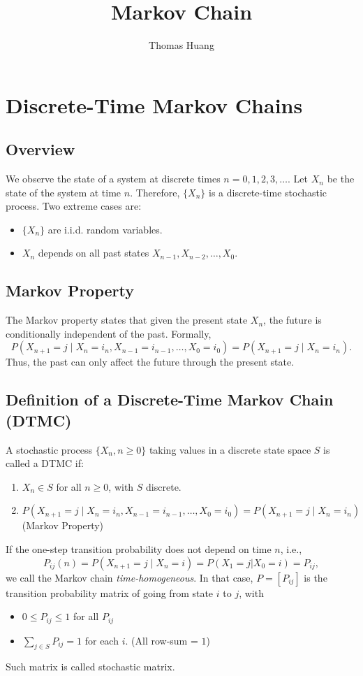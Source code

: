 \documentclass[12pt]{article}
\title{Markov Chain}
\author{Thomas Huang}
\begin{document}
\maketitle
\title{}
\section*{Discrete-Time Markov Chains}

\subsection*{Overview}
We observe the state of a system at discrete times $n = 0, 1, 2, 3, \ldots$. Let $X_n$ be the state of the system at time $n$. Therefore, $\{ X_n \}$ is a discrete-time stochastic process. Two extreme cases are:
\begin{itemize}
\item $\{ X_n \}$ are i.i.d. random variables.
\item $X_n$ depends on all past states $X_{n-1}, X_{n-2}, \ldots, X_0$.
\end{itemize}

\subsection*{Markov Property}
The Markov property states that given the present state $X_n$, the future is conditionally independent of the past. Formally,
\[
P(X_{n+1} = j \mid X_n = i_n, X_{n-1} = i_{n-1}, \ldots, X_0 = i_0 )
= P(X_{n+1} = j \mid X_n = i_n).
\]
Thus, the past can only affect the future through the present state.

\subsection*{Definition of a Discrete-Time Markov Chain (DTMC)}
A stochastic process $\{X_n, n \ge 0\}$ taking values in a discrete state space $S$ is called a DTMC if:
\begin{enumerate}
\item $X_n \in S$ for all $n \ge 0$, with $S$ discrete.
\item $P(X_{n+1} = j \mid X_n = i_n, X_{n-1} = i_{n-1}, \ldots, X_0 = i_0 ) = P(X_{n+1} = j \mid X_n = i_n)$ (Markov Property)
\end{enumerate}

If the one-step transition probability does not depend on time $n$, i.e.,
\[
P_{ij}(n) = P(X_{n+1} = j \mid X_n = i) = P(X_1=j|X_0=i)= P_{ij},
\]
we call the Markov chain \emph{time-homogeneous}. In that case, $P = [P_{ij}]$ is the transition probability matrix of going from state \(i\) to \(j\), with 
\begin{itemize}
    \item $ 0\le P_{ij} \le 1$ for all $P_{ij}$
    \item $\sum_{j\in S} P_{ij} = 1$ for each $i$. (All row-sum = $1$)
\end{itemize}
Such matrix is called stochastic matrix.
\end{document}
